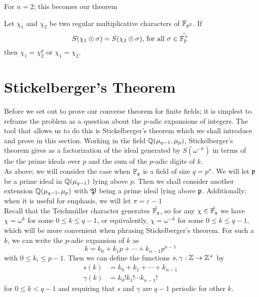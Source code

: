 For $n=2$; this becomes our theorem 
\begin{theorem}\label{thm:local-converse-FF}
Let $\chi_1$ and $\chi_2$ be two regular multiplicative characters of $\mathbb{F}_{p^2}$. If \[S(\chi_1 \otimes \sigma) = S(\chi_2 \otimes \sigma)\text{, for all } \sigma \in \hat{\mathbb{F}_p^\times}\] then $\chi_1 = \chi_2^{p}$ or $\chi_1 = \chi_2$.
\end{theorem}


\section{Stickelberger's Theorem}
\label{sec:stickelberger}
Before we set out to prove our converse theorem for finite fields; it is simplest to reframe the problem as a question about the $p$-adic expansions of integers.
The tool that allows us to do this is Stickelberger's theorem which we shall introduce and prove in this section.
Working in the field $\mathbb{Q}(\mu_{q-1}, \mu_p)$, Stickelberger's theorem gives as a factorization of the ideal generated by $S(\omega^{-k})$ in terms of the the prime ideals over $p$ and the sum of the $p$-adic digits of $k$.
\\

As above; we will consider the case when $\mathbb{F}_q$ is a field of size $q = p^n$. 
We will let $\mathfrak{p}$ be a prime ideal in $\mathbb{Q}(\mu_{q-1})$ lying above $p$. 
Then we shall consider another extension $\mathbb{Q}(\mu_{q-1}, \mu_p)$ with $\mathfrak{P}$ being a prime ideal lying above $\mathfrak{p}$. Additionally; when it is useful for emphasis, we will let $\pi = \varepsilon - 1$
\\

Recall that the Teichm\"uller character generates $\hat{\mathbb{F}_q}$, so for any $\chi \in \hat{\mathbb{F}_q}$ we have $\chi = \omega^k$ for some $0 \leq k \leq q-1$, or equivalently, $\chi = \omega^{-k}$ for some $0 \leq k \leq q-1$, which will be more convenient when phrasing Stickelberger's theorem.
For such a $k$, we can write the $p$-adic expansion of $k$ as
\[k = k_0 + k_1 p + \cdots + k_{n-1}p^{n-1}\]
with $0 \leq k_i \leq p-1$. Then we can define the functions $s, \gamma : \mathbb{Z} \to \mathbb{Z}^+$ by 
\begin{align*}
s(k) &= k_0 + k_1 + \cdots + k_{n-1} \\
\gamma(k) &= k_0! k_1!  \cdots  k_{n-1}!
\end{align*}
for $0 \leq k < q-1$ and requiring that $s$ and $\gamma$ are $q-1$ periodic for other $k$.
\\

